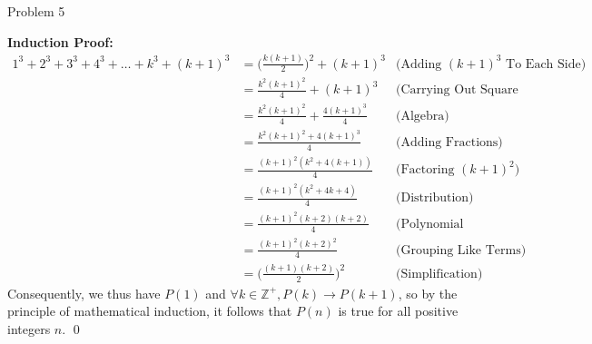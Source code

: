\begin{problem}{Problem 5}
\begin{highlight}[Solution]
        \noindent \textbf{Induction Proof:}
        \footnotesize{
            \begin{align*}
                1^{3} + 2^{3} + 3^{3} + 4^{3} + \dots + k^{3} + (k + 1)^{3} & = \Big(\frac{k(k + 1)}{2}\Big)^{2} + (k + 1)^{3} & \text{(Adding $(k + 1)^{3}$ To Each Side)} \\
                & = \frac{k^{2}(k + 1)^{2}}{4} + (k + 1)^{3} & \text{(Carrying Out Square Of First Term)} \\
                & = \frac{k^{2}(k + 1)^{2}}{4} + \frac{4(k + 1)^{3}}{4} & \text{(Algebra)} \\
                & = \frac{k^{2}(k + 1)^{2} + 4(k + 1)^{3}}{4} & \text{(Adding Fractions)} \\
                & = \frac{(k + 1)^{2}(k^{2} + 4(k + 1))}{4} & \text{(Factoring $(k + 1)^{2}$)} \\
                & = \frac{(k + 1)^{2}(k^{2} + 4k + 4)}{4} & \text{(Distribution)} \\
                & = \frac{(k + 1)^{2}(k + 2)(k + 2)}{4} & \text{(Polynomial Factorization)} \\
                & = \frac{(k + 1)^{2}(k + 2)^{2}}{4} & \text{(Grouping Like Terms)} \\
                & = \Big(\frac{(k + 1)(k + 2)}{2}\Big)^{2} & \text{(Simplification)}
            \end{align*}
        }
        \normalsize
        Consequently, we thus have $P(1)$ and $\forall k \in \mathbb{Z}^{+}, P(k) \rightarrow P(k + 1)$, so by the principle of mathematical induction, it follows that $P(n)$ is true for all positive
        integers $n$. \qed
    \end{highlight}
\end{problem}

